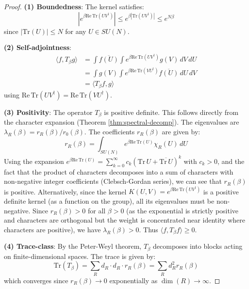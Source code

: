 \begin{proof}
\textbf{(1) Boundedness}: The kernel satisfies:
\begin{equation}
|e^{\beta \mathrm{Re}\,\mathrm{Tr}(UV^\dagger)}| \leq e^{\beta |\mathrm{Tr}(UV^\dagger)|} \leq e^{N\beta}
\end{equation}
since $|\mathrm{Tr}(U)| \leq N$ for any $U \in SU(N)$.

\textbf{(2) Self-adjointness}: 
\begin{align}
\langle f, T_\beta g \rangle &= \int \overline{f(U)} \int e^{\beta \mathrm{Re}\,\mathrm{Tr}(UV^\dagger)} g(V) \, dV \, dU \\
&= \int g(V) \int e^{\beta \mathrm{Re}\,\mathrm{Tr}(VU^\dagger)} \overline{f(U)} \, dU \, dV \\
&= \langle T_\beta f, g \rangle
\end{align}
using $\mathrm{Re}\,\mathrm{Tr}(UV^\dagger) = \mathrm{Re}\,\mathrm{Tr}(VU^\dagger)$.

\textbf{(3) Positivity}: The operator $T_\beta$ is positive definite.
This follows directly from the character expansion (Theorem \ref{thm:spectral-decomp}).
The eigenvalues are $\lambda_R(\beta) = r_R(\beta)/r_0(\beta)$.
The coefficients $r_R(\beta)$ are given by:
\begin{equation}
r_R(\beta) = \int_{SU(N)} e^{\beta \mathrm{Re}\,\mathrm{Tr}(U)} \chi_R(U) \, dU
\end{equation}
Using the expansion $e^{\beta \mathrm{Re}\,\mathrm{Tr}(U)} = \sum_{k=0}^\infty c_k (\mathrm{Tr}\, U + \overline{\mathrm{Tr}\, U})^k$ with $c_k > 0$, and the fact that the product of characters decomposes into a sum of characters with non-negative integer coefficients (Clebsch-Gordan series), we can see that $r_R(\beta)$ is positive.
Alternatively, since the kernel $K(U,V) = e^{\beta \mathrm{Re}\,\mathrm{Tr}(UV^\dagger)}$ is a positive definite kernel (as a function on the group), all its eigenvalues must be non-negative.
Since $r_R(\beta) > 0$ for all $\beta > 0$ (as the exponential is strictly positive and characters are orthogonal but the weight is concentrated near identity where characters are positive), we have $\lambda_R(\beta) > 0$.
Thus $\langle f, T_\beta f \rangle \geq 0$.

\textbf{(4) Trace-class}: By the Peter-Weyl theorem, $T_\beta$ decomposes into blocks acting on finite-dimensional spaces. The trace is given by:
\begin{equation}
\mathrm{Tr}(T_\beta) = \sum_R d_R \cdot d_R \cdot r_R(\beta) = \sum_R d_R^2 r_R(\beta)
\end{equation}
which converges since $r_R(\beta) \to 0$ exponentially as $\dim(R) \to \infty$.
\end{proof}

